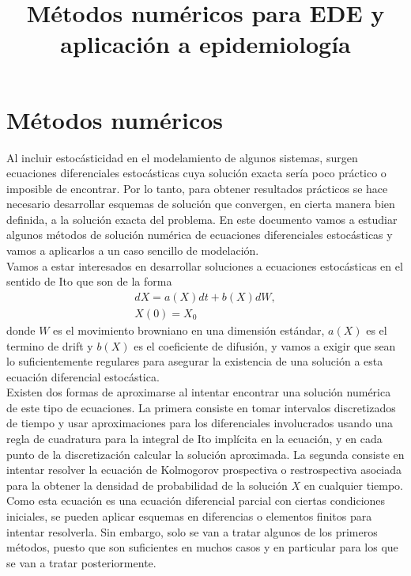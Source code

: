 \documentclass{article}
\title{Métodos numéricos para EDE y aplicación a epidemiología}
\date{}
\begin{document}
\theoremstyle{definition}
\newtheorem{definition}{Definición}[section]
\newtheorem{theorem}{Teorema}
\newtheorem*{definition*}{Definición}
\newtheorem*{theorem*}{Teorema}
\maketitle
\section{Métodos numéricos }
\noindent
Al incluir estocásticidad en el modelamiento de algunos sistemas, surgen ecuaciones diferenciales estocásticas cuya solución exacta sería poco práctico o imposible de encontrar. Por lo tanto, para obtener resultados prácticos se hace necesario desarrollar esquemas de solución que convergen, en cierta manera bien definida, a la solución exacta del problema. En este documento vamos a estudiar algunos métodos de solución numérica de ecuaciones diferenciales estocásticas y vamos a aplicarlos a un caso sencillo de modelación.  \\

\noindent
Vamos a estar interesados en desarrollar soluciones a ecuaciones estocásticas en el sentido de Ito que son de la forma
\begin{equation}
\begin{split}
        dX=a(X)dt+b(X)dW,\\
        X(0)=X_0
\end{split}
\end{equation}
donde $W$ es el movimiento browniano en una dimensión estándar,  $a(X)$ es el termino de drift y $b(X)$ es el coeficiente de difusión, y vamos a exigir que sean lo suficientemente regulares para asegurar la existencia de una solución a esta ecuación diferencial estocástica.\\

\noindent
Existen dos formas de aproximarse al intentar encontrar una solución numérica de este tipo de ecuaciones. La primera consiste en tomar intervalos discretizados de tiempo y usar aproximaciones para los diferenciales involucrados usando una regla de cuadratura para la integral de Ito implícita en la ecuación, y en cada punto de la discretización calcular la solución aproximada. La segunda consiste en intentar resolver la ecuación de Kolmogorov prospectiva o restrospectiva asociada para la obtener la densidad de probabilidad de la solución $X$ en cualquier tiempo. Como esta ecuación es una ecuación diferencial parcial con ciertas condiciones iniciales, se pueden aplicar esquemas en diferencias o elementos finitos para intentar resolverla. Sin embargo, solo se van a tratar algunos de los primeros métodos, puesto que son suficientes en muchos casos y en particular para los que se van a tratar posteriormente.\\
\end{document}
